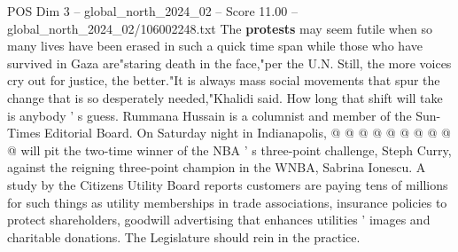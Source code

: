 \begin{textsample}{POS Dim 3 – global\_north\_2024\_02 – Score 11.00 – global\_north\_2024\_02/106002248.txt}
The \textbf{protests} may seem futile when so many lives have been erased in such a quick time span while those who have survived in Gaza are"staring death in the face,"per the U.N.
Still, the more voices cry out for justice, the better."It is always mass social movements that spur the change that is so desperately needed,"Khalidi said.
How long that shift will take is anybody ' s guess.
Rummana Hussain is a columnist and member of the Sun-Times Editorial Board.
On Saturday night in Indianapolis, @ @ @ @ @ @ @ @ @ @ will pit the two-time winner of the NBA ' s three-point challenge, Steph Curry, against the reigning three-point champion in the WNBA, Sabrina Ionescu.
A study by the Citizens Utility Board reports customers are paying tens of millions for such things as utility memberships in trade associations, insurance policies to protect shareholders, goodwill advertising that enhances utilities ' images and charitable donations.
The Legislature should rein in the practice.

\end{textsample}
